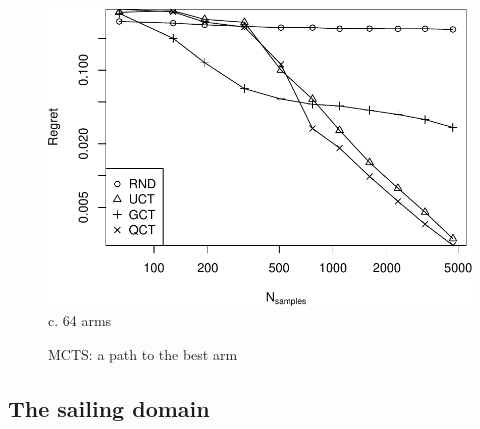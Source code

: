 \documentclass{article}
\begin{document}
\begin{figure}
\begin{minipage}[c]{0.5\linewidth}
    \includegraphics[scale=0.4]{tree-identity-k=64-uqb=8.pdf} \\
    c. 64 arms
 \end{minipage}
  \label{fig:mcts-regret}
  \caption{MCTS: a path to the best arm}
\end{figure}

\subsection{The sailing domain}
\end{document}

